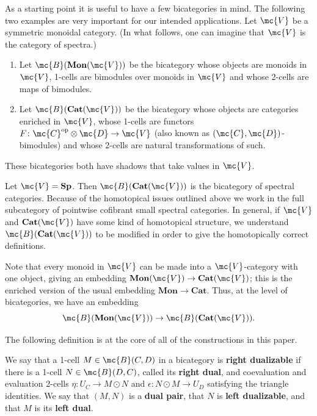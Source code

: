 \documentclass[11pt]{amsart}
\newcommand{\mbf}{\mathbf}
\begin{document}
As a starting point it is useful to have a few bicategories in mind. 
The following two examples are very important for our intended applications.  Let $\mc{V}$ be a symmetric monoidal category. (In what follows, one can imagine that $\mc{V}$ is the category of spectra.) 
\begin{enumerate}
  \item   Let $\mc{B}(\mathbf{Mon}(\mc{V}))$ be the bicategory whose  objects are monoids in $\mc{V}$, 1-cells are bimodules over monoids in $\mc{V}$ and whose 2-cells are maps of bimodules.
  \item  Let $\mc{B}(\mathbf{Cat}(\mc{V}))$ be the bicategory whose objects are categories enriched in $\mc{V}$, whose 1-cells are functors $F \colon  \mc{C}^{\text{op}} \otimes \mc{D} \to \mc{V}$ (also known as $(\mc{C}, \mc{D})$-bimodules) and whose 2-cells are natural transformations of such. 
\end{enumerate}
These bicategories both have shadows that take values in $\mc{V}$.

\begin{example}\label{bcat_example}
Let $\mc{V} = \mbf{Sp}$. Then $\mc{B}(\mathbf{Cat}(\mc{V}))$ is the bicategory of spectral categories. Because of the homotopical issues outlined above we work in the full subcategory of pointwise cofibrant small spectral categories. In general, if $\mc{V}$ and $\mbf{Cat}(\mc{V})$ have some kind of homotopical structure, we understand $\mc{B}(\mbf{Cat}(\mc{V}))$ to be modified in order to give the homotopically correct definitions. 
\end{example}

\begin{rmk}
  Note that every monoid in $\mc{V}$ can be made into a $\mc{V}$-category with one object, giving an embedding $\mbf{Mon}(\mc{V}) \to \mbf{Cat}(\mc{V})$; this is the enriched version of the usual embedding $\mbf{Mon} \to \mbf{Cat}$. Thus, at the level of bicategories, we have an embedding
  \[
  \mc{B}(\mbf{Mon}(\mc{V})) \to \mc{B}(\mbf{Cat}(\mc{V})).  
  \]
\end{rmk} 


The following definition is at the core of all of the constructions in this paper. 

\begin{defn}We say that a 1-cell $M\in \mc{B}(C,D)$ in a bicategory is \textbf{right dualizable} if there is a 1-cell $N\in \mc{B}(D,C)$, called its \textbf{right dual}, and coevaluation and evaluation 2-cells $\eta\colon U_C \to M\odot N$ and $\epsilon \colon N\odot M\to U_D$ satisfying the triangle identities.
We  say that $(M,N)$ is a \textbf{dual pair}, that $N$ is \textbf{left dualizable}, and that $M$ is its \textbf{left dual}.
\end{defn}
\end{document}
